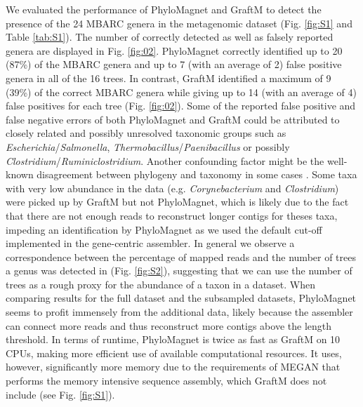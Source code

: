 \documentclass[a4paper]{article}
\begin{document}
We evaluated the performance of PhyloMagnet and GraftM to detect the presence of the 24 MBARC genera \citep[23 of those detectable, as Nocardiopsis was part of the pooled community but not present in the sequence data from][]{Singer2016} in the metagenomic dataset (Fig. \ref{fig:S1} and Table \ref{tab:S1}). The number of correctly detected as well as falsely reported genera are displayed in Fig. \ref{fig:02}. PhyloMagnet correctly identified up to 20 (87\%) of the MBARC genera and up to 7 (with an average of 2) false positive genera in all of the 16 trees. In contrast, GraftM identified a maximum of 9 (39\%) of the correct MBARC genera while giving up to 14 (with an average of 4) false positives for each tree (Fig. \ref{fig:02}). Some of the reported false positive and false negative errors of both PhyloMagnet and GraftM could be attributed to closely related and possibly unresolved taxonomic groups such as \textit{Escherichia}/\textit{Salmonella}, \textit{Thermobacillus}/\textit{Paenibacillus} or possibly \textit{Clostridium}/\textit{Ruminiclostridium}. Another confounding factor might be the well-known disagreement between phylogeny and taxonomy in some cases \citep[e.g. \textit{Escherichia}/\textit{Salmonella};][]{Retchless2010}.  Some taxa with very low abundance in the data (e.g. \textit{Corynebacterium} and \textit{Clostridium}) were picked up by GraftM but not PhyloMagnet, which is likely due to the fact that there are not enough reads to reconstruct longer contigs for theses taxa, impeding an identification by PhyloMagnet as we used the default cut-off implemented in the gene-centric assembler. In general we observe a correspondence between the percentage of mapped reads \citep{Singer2016} and the number of trees a genus was detected in (Fig. \ref{fig:S2}), suggesting that we can use the number of trees as a rough proxy for the abundance of a taxon in a dataset.  
When comparing results for the full dataset and the subsampled datasets, PhyloMagnet seems to profit immensely from the additional data, likely because the assembler can connect more reads and thus reconstruct more contigs above the length threshold.
In terms of runtime, PhyloMagnet is twice as fast as GraftM on 10 CPUs, making more efficient use of available computational resources. It uses, however, significantly more memory due to the requirements of MEGAN that performs the memory intensive sequence assembly, which GraftM does not include (see Fig. \ref{fig:S1}).
\end{document}
